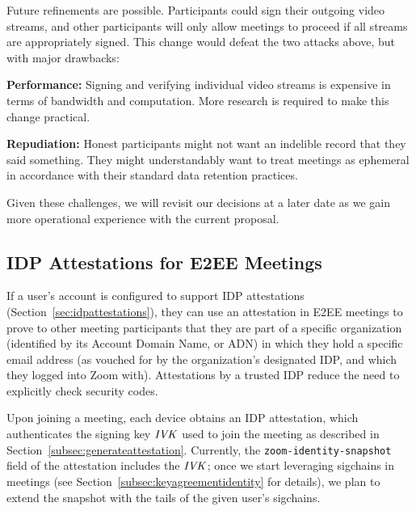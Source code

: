 Future refinements are possible. Participants could sign their outgoing video streams, and other
participants will only allow meetings to proceed if all streams are appropriately signed. This
change would defeat the two attacks above, but with major drawbacks:
%
\begin{description}
    \item {\bf Performance:} Signing and verifying individual video streams is expensive in
    terms of bandwidth and computation. More research is required to make this change practical.
    \item {\bf Repudiation:} Honest participants might not want an indelible record that they said
    something. They might understandably want to treat meetings as ephemeral in accordance with
    their standard data retention practices.
\end{description}

Given these challenges, we will revisit our decisions at a later date as we gain more operational
experience with the current proposal.

\subsection{IDP Attestations for E2EE Meetings}
\label{subsec:idpattestationmeetings}

If a user's account is configured to support IDP attestations (Section~\ref{sec:idpattestations}),
they can use an attestation in E2EE meetings to prove to other meeting participants that they are
part of a specific organization (identified by its Account Domain Name, or ADN) in which they hold a
specific email address (as vouched for by the organization's designated IDP, and which they logged
into Zoom with). Attestations by a trusted IDP reduce the need to explicitly check security codes.

Upon joining a meeting, each device obtains an IDP attestation, which authenticates the signing key
$\mathit{IVK}$ used to join the meeting as described in Section~\ref{subsec:generateattestation}. Currently,
the \texttt{zoom-identity-snapshot} field of the attestation includes the $\mathit{IVK}$; once we start
leveraging sigchains in meetings (see Section~\ref{subsec:keyagreementidentity} for details),  we
plan to extend the snapshot with the tails of the given user's sigchains. 

